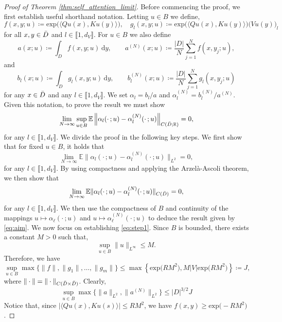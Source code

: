 \documentclass[twoside]{article}
\newcommand{\1}{\mathbbm{1}}
\newcommand{\R}{\mathbbm{R}}
\newcommand{\range}[2]{\llbracket #1, #2 \rrbracket}
\providecommand{\mathbbm}{\mathbb} %
\newcommand{\E}{\mathbb{E}}
\begin{document}
\begin{proof}[Proof of Theorem \ref{thm:self_attention_limit}]
Before commencing the proof, we first establish useful shorthand notation. Letting \(u \in B\) we define,
\[f(x,y;u) \coloneqq \mathrm{exp} \big ( \langle Q u(x), K u(y) \rangle \big ), \quad g_l(x,y;u) \coloneqq \mathrm{exp} \big ( \langle Q u(x), K u(y) \rangle \big ) \big( Vu(y) \big )_l  \]
for all \(x,y \in \Bar{D}\) and \(l \in \range{1}{d_V}\). For $u\in B$ we also define
\[a(x;u) \coloneqq \int_D f(x,y;u) \: \mathrm{d}y, \qquad a^{(N)}(x;u) \coloneqq \frac{|D|}{N} \sum_{j=1}^N f(x,y_j;u),\]
and
\[b_l(x;u) \coloneqq \int_D g_l(x,y;u) \: \mathrm{d}y, \qquad b^{(N)}_l(x;u) \coloneqq \frac{|D|}{N} \sum_{j=1}^N g_l(x,y_j;u)\]
for any $x\in\Bar{D}$ and any \(l \in \range{1}{d_V}\). We set \(\alpha_l = b_l/a\) and \(\alpha_l^{(N)} = b_l^{(N)}/a^{(N)}\). Given this notation, to prove the result we must show
\begin{equation}
\label{eq:aim}
\lim_{N \to \infty} \sup_{u \in B} \E \left \| \alpha_l(\cdot\,;u) - \alpha_l^{(N)}(\cdot\,;u) \right\|_{C(\Bar{D};\R)}=0,
\end{equation}
for any $l\in\range{1}{d_V}$. We divide the proof in the following key steps. We first show that for fixed $u\in B$, it holds that
\begin{equation}
\label{eq:step1}
    \lim_{N \to \infty} \E \|\alpha_l(\cdot\,;u) - \alpha_l^{(N)}(\cdot\,;u)\|_{L^2} = 0,
\end{equation}
for any $l\in\range{1}{d_V}$. By using compactness and applying the Arzel\`a-Ascoli theorem, we then show that
\begin{equation}
\label{eq:step2}
\lim_{N \to \infty} \E \|\alpha_l(\cdot\,;u) - \alpha_l^{(N)}(\cdot\,;u)\|_{C(\Bar{D})} = 0,
\end{equation}
for any $l\in\range{1}{d_V}$. We then use the compactness of $B$ and continuity of the mappings $u\mapsto \alpha_\ell(\cdot\, ;u)$ and $u\mapsto \alpha^{(N)}_\ell(\cdot\, ;u)$ to deduce the result given by \eqref{eq:aim}.
We now focus on establishing \eqref{eq:step1}. Since \(B\) is bounded, there exists a constant \(M > 0\) such that,
\[\sup_{u \in B} \|u\|_{L^\infty} \leq M.\]
Therefore, we have
\[\sup_{u \in B} \max \{ \|f\|, \|g_1\|, \dots, \|g_m\| \} \leq \max \left \{ \text{exp} \big( RM^2 \big ), M |V| \text{exp} \big (RM^2 \big ) \right \} \coloneqq J,\]
where \(\|\cdot\| = \|\cdot\|_{C(\Bar{D} \times \Bar{D})}\).
Clearly,
\[\sup_{u \in B} \max \{ \|a\|_{L^2}, \|a^{(N)}\|_{L^2} \} \leq |D|^{3/2} J\]
Notice that, since \(|\langle Q u(x), K u(s) \rangle| \leq RM^2\), we have \(f(x,y) \geq \text{exp} \big ( - R M^2 \big )\).

\end{proof}
\end{document}
